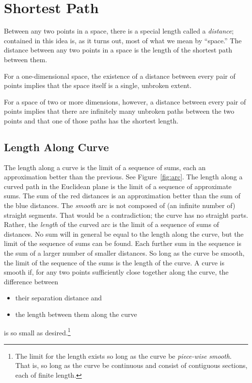 \section{Shortest Path}

Between any two points in a space, there is a special length called a
\emph{distance}; contained in this idea is, as it turns out, most of what we
mean by ``space.'' The distance between any two points in a space is the length
of the shortest path between them.

For a one-dimensional space, the existence of a distance between every pair of
points implies that the space itself is a single, unbroken extent.

For a space of two or more dimensions, however, a distance between every pair
of points implies that there are infinitely many unbroken paths between the two
points and that one of those paths has the shortest length.

\subsection{Length Along Curve}

The length along a curve is the limit of a sequence of sums, each an
approximation better than the previous.  See Figure~\ref{fig:arc}.  The length
along a curved path in the Euclidean plane is the limit of a sequence of
approximate sums.  The sum of the red distances is an approximation better than
the sum of the blue distances.  The \emph{smooth} arc is not composed of (an
infinite number of) straight segments.  That would be a contradiction; the
curve has no straight parts.  Rather, the \emph{length} of the curved arc is
the limit of a sequence of sums of distances.  No sum will in general be equal
to the length along the curve, but the limit of the sequence of sums can be
found.  Each further sum in the sequence is the sum of a larger number of
smaller distances.  So long as the curve be smooth, the limit of the sequence
of the sums is the length of the curve.  A curve is smooth if, for any two
points sufficiently close together along the curve, the difference between
\begin{itemize}[noitemsep]
   \item their separation distance and
   \item the length between them along the curve
\end{itemize}
is so small as desired.\footnote{%
   The limit for the length exists so long as the curve be \emph{piece-wise
   smooth}.  That is, so long as the curve be continuous and consist of
   contiguous sections, each of finite length.%
}

